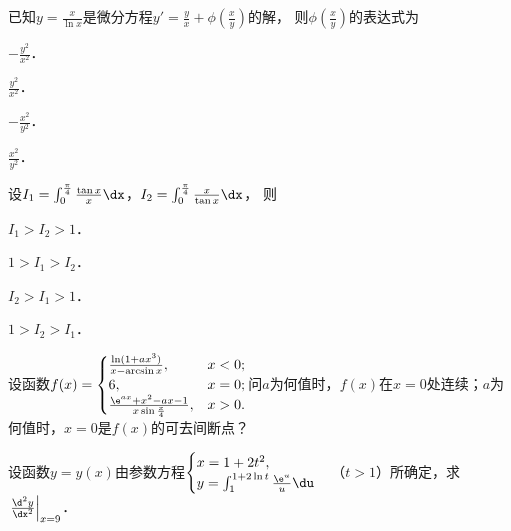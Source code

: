 \documentclass[plain,noanswer,medmath]{../../template/jnuexam}
\begin{document}
\begin{problem}
已知$y = \frac{x}{\ln x}$是微分方程$y' = \frac{y}{x} + \phi \left(\frac{x}{y} \right)$的解，
则$\phi \left(\frac{x}{y} \right)$的表达式为\pickout{}
\begin{abcd}
\item $- \frac{y^2}{x^2}$．
\item $\frac{y^2}{x^2}$．
\item $- \frac{x^2}{y^2}$．
\item $\frac{x^2}{y^2}$．
\end{abcd}
\end{problem}




\begin{problem}
设$I_1 = \int_0^{\frac{\pi}{4}} \frac{\tan x}{x}\dx$，$I_2 = \int_0^{\frac{\pi}{4}} \frac{x}{\tan x} \dx$，
则\pickout{}
\begin{abcd}
\item $I_1 > I_2 > 1$．
\item $1 > I_1 > I_2$．
\item $I_2 > I_1 > 1$．
\item $1 > I_2 > I_1$．
\end{abcd}
\end{problem}





\begin{problem}
设函数$f(x) = \begin{cases}
               \frac{\ln(1 + ax^3)}{x - \arcsin x}, & x < 0; \\
                                                 6, & x = 0; \\
  \frac{\e^{ax} + x^2 - ax - 1}{x\sin \frac{x}{4}}, & x > 0.
\end{cases}$问$a$为何值时，$f(x)$在$x = 0$处连续；$a$为何值时，$x = 0$是$f(x)$的可去间断点？
\end{problem}



\begin{problem}
设函数$y = y(x)$由参数方程$\begin{cases}
  x = 1 + 2t^2, \\
  y = \int_1^{1 + 2\ln t} \frac{\e^u}{u}\du
\end{cases}$（$t > 1$）所确定，求$\left. \frac{\d^2y}{\dx^2} \right|_{x = 9}$．
\end{problem}
\end{document}
